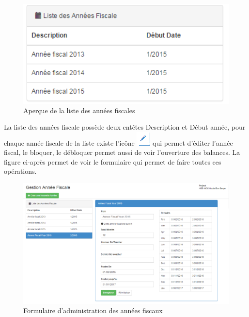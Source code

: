 \documentclass[12pt,a4paper]{report}
\begin{document}
\begin{figure}[h]
\begin{center}
\includegraphics[width=16cm]{pic/ListeAnnFisc.png}
\end{center}
\caption{Aperçue de la liste des années fiscales}
\label{Aperçue de la liste des années fiscaux}
\end{figure}


La liste des années fiscale possède deux entêtes Description et Début année, pour chaque année fiscale de la liste existe l'icône \includegraphics[scale=0.7]{pic/EditUser.png} qui permet d'éditer l'année fiscal, le bloquer, le débloquer permet aussi de voir l'ouverture des balances. La figure ci-après permet de voir le formulaire qui permet de faire toutes ces opérations.

\begin{figure}[h]
\begin{center}
\includegraphics[width=12cm]{pic/FormAddFiscYear.png}
\end{center}
\caption{Formulaire d'administration des années fiscaux}
\label{Formulaire d'administration des années fiscaux}
\end{figure}
\end{document}
